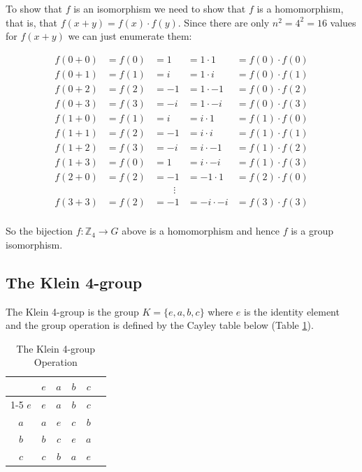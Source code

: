 \documentclass{article}
\theoremstyle{definition}
\begin{document}
\bigskip
\noindent
To show that $f$ is an isomorphism we need to show that $f$ is a homomorphism, that is, that 
$f(x+y) = f(x) \cdot f(y)$.  Since there are only $n^2 = 4^2 = 16$ values for $f(x+y)$  we can just 
enumerate them:

\begin{equation*}
\begin{array}{lllll}
f(0+0) &= f(0) &= 1  &= 1 \cdot 1     &=  f(0) \cdot f(0) \\
f(0+1) &= f(1) &= i   &= 1 \cdot i      &=  f(0) \cdot f(1) \\
f(0+2) &= f(2) &= -1 &= 1 \cdot -1   &=  f(0) \cdot f(2)  \\
f(0+3) &= f(3) &= -i  &= 1 \cdot  -i    &=  f(0) \cdot f(3) \\
f(1+0) &= f(1) &= i   &=  i \cdot 1      &=  f(1) \cdot f(0) \\
f(1+1) &= f(2) &= -1 &=  i \cdot i       &=  f(1) \cdot f(1)  \\
f(1+2) &= f(3) &= -i  &=  i \cdot  -1    &=  f(1) \cdot f(2) \\
f(1+3) &= f(0) &= 1  &=  i \cdot -i      &=  f(1) \cdot f(3) \\
f(2+0) &= f(2) &= -1 &=  -1 \cdot 1    &=  f(2) \cdot f(0)  \\
&& \qquad \vdots                                                           \\
f(3+3) &= f(2) &= -1 &=  -i \cdot -i   &=  f(3) \cdot f(3)  \\
\end{array}
\end{equation*}

\bigskip
\noindent
So the bijection $f: \mathbb{Z}_4 \rightarrow G$ above is a homomorphism and hence $f$ is a group isomorphism.


\subsection{The Klein 4-group}
\label{subsub:klein}

The Klein 4-group is the group $K = \{e,a,b,c\}$ where $e$ is the identity element and the group operation
is defined by the Cayley table below (Table \ref{tab:klein}).

\bigskip
\begin{table}[H]
\centering
\begin{tabular}{c | c c c c c} 
& $e$ & $a$ & $b$ & $c$ \\
\cline{1-5}
$e$ & $e$ & $a$ & $b$ & $c$ \\
$a$ & $a$ & $e$ & $c$ & $b$ \\
$b$ & $b$ & $c$ & $e$ & $a$ \\
$c$ & $c$ & $b$ & $a$ & $e$
\end{tabular}
\caption{The Klein 4-group Operation} 
\label{tab:klein}
\end{table}
\end{document}
